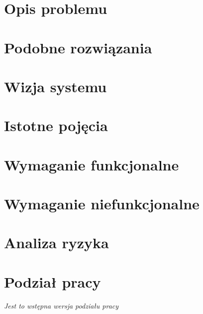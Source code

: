 \documentclass[../praca-dyplomowa.tex]{subfiles}
\begin{document}
\section{Opis problemu}


\section{Podobne rozwiązania}


\section{Wizja systemu}


\section{Istotne pojęcia}


\section{Wymaganie funkcjonalne}


\section{Wymaganie niefunkcjonalne}


\section{Analiza ryzyka}


\section{Podział pracy}

\textit{Jest to wstępna wersja podziału pracy}
\end{document}
